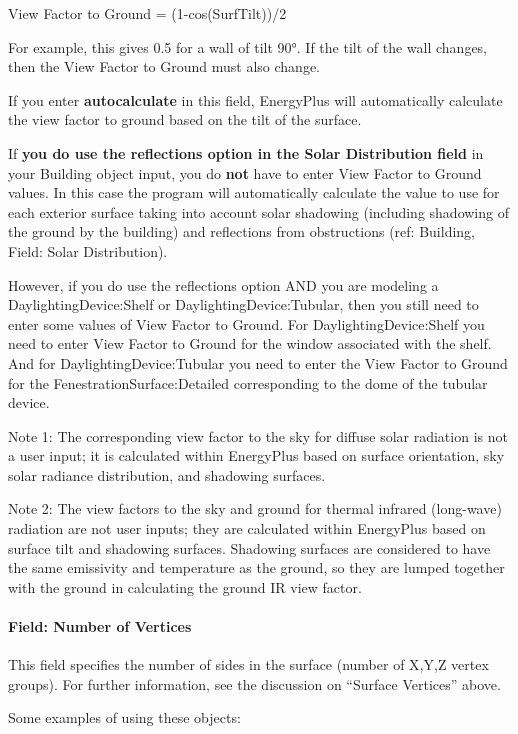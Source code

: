 View Factor to Ground = (1-cos(SurfTilt))/2

For example, this gives 0.5 for a wall of tilt 90°. If the tilt of the wall changes, then the View Factor to Ground must also change.

If you enter \textbf{autocalculate} in this field, EnergyPlus will automatically calculate the view factor to ground based on the tilt of the surface.

If \textbf{you do use the reflections option in the Solar Distribution field} in your Building object input, you do \textbf{not} have to enter View Factor to Ground values. In this case the program will automatically calculate the value to use for each exterior surface taking into account solar shadowing (including shadowing of the ground by the building) and reflections from obstructions (ref: Building, Field: Solar Distribution).

However, if you do use the reflections option AND you are modeling a DaylightingDevice:Shelf or DaylightingDevice:Tubular, then you still need to enter some values of View Factor to Ground. For DaylightingDevice:Shelf you need to enter View Factor to Ground for the window associated with the shelf. And for DaylightingDevice:Tubular you need to enter the View Factor to Ground for the FenestrationSurface:Detailed corresponding to the dome of the tubular device.

Note 1: The corresponding view factor to the sky for diffuse solar radiation is not a user input; it is calculated within EnergyPlus based on surface orientation, sky solar radiance distribution, and shadowing surfaces.

Note 2: The view factors to the sky and ground for thermal infrared (long-wave) radiation are not user inputs; they are calculated within EnergyPlus based on surface tilt and shadowing surfaces. Shadowing surfaces are considered to have the same emissivity and temperature as the ground, so they are lumped together with the ground in calculating the ground IR view factor.

\paragraph{Field: Number of Vertices}\label{field-number-of-vertices-2}

This field specifies the number of sides in the surface (number of X,Y,Z vertex groups). For further information, see the discussion on ``Surface Vertices'' above.

Some examples of using these objects:

